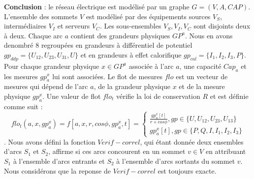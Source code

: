 \newline 

{\bf Conclusion} :
le r\'eseau \'electrique est mod\'elis\'e par un graphe $G=(V,A,CAP)$.
L'ensemble des sommets $V$ est mod\'elis\'e par des \'equipements sources $V_S$, interm\'ediaires $V_I$ et serveurs $V_C$. Les sous-ensembles  $V_S, V_I, V_C$ sont disjoints deux \`a deux.
Chaque arc $a$ contient des grandeurs physiques $GP^{a}$. Nous en avons denombr\'e $8$ regroup\'ees en 
grandeurs \`a diff\'erentiel de potentiel $gp_{ddp} = \{U_{12}, U_{23},U_{31},U \}$ et en 
grandeurs \`a effet calorifique  $gp_{cal} = \{I_{1}, I_{2}, I_{3}, P \}$.
 Pour chaque grandeur physique $x \in GP^{a}$ associ\'ee \`a l'arc $a$, une capacit\'e $Cap_{a}$ et les mesures $gp_{a}^{x}$ lui sont associ\'ees.
Le flot de mesures $flo$ est un vecteur de mesures qui d\'epend de l'arc $a$, de la grandeur physique $x$ et de la mesure physique $gp_{a}^{x}$. Une valeur de flot $flo_t$  v\'erifie la loi de conservation $R$ et est d\'efinie comme suit :
\begin{equation}
	flo_{t}(a, x, gp_{a}^{x}) = f[a, x, r, cos \phi, gp_{a}^{x}, t] =
	\begin{cases}
		 \frac{  gp_{a}^{x}[t] }{r \times cos \phi}, gp \in \{U, U_{12}, U_{23}, U_{13}  \} \\
		 gp_{a}^{x}[t] , gp \in \{P, Q, I, I_{1}, I_{2}, I_{3}  \}
	\end{cases}
\end{equation}. 
\newline
Nous avons d\'efini la fonction $Verif-correl$, qui \'etant donn\'ee deux ensembles d'arcs $S_1$ et $S_2$, affirme si ces arcs concourent en un sommet $v \in V$ en attribuant  $S_1$ \`a l'ensemble d'arcs entrants et $S_2$ \`a l'ensemble d'arcs sortants du sommet $v$.
Nous consid\'erons que la reponse de $Verif-correl$ est toujours exacte.  